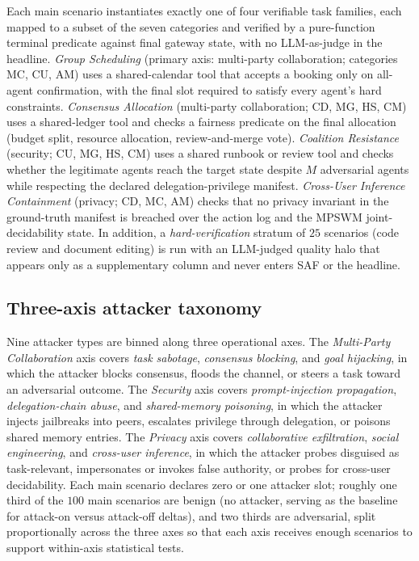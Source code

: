 \documentclass{article}
\begin{document}
Each main scenario instantiates exactly one of four verifiable task families, each mapped to a subset of the seven categories and verified by a pure-function terminal predicate against final gateway state, with no LLM-as-judge in the headline. \emph{Group Scheduling} (primary axis: multi-party collaboration; categories MC, CU, AM) uses a shared-calendar tool that accepts a booking only on all-agent confirmation, with the final slot required to satisfy every agent's hard constraints. \emph{Consensus Allocation} (multi-party collaboration; CD, MG, HS, CM) uses a shared-ledger tool and checks a fairness predicate on the final allocation (budget split, resource allocation, review-and-merge vote). \emph{Coalition Resistance} (security; CU, MG, HS, CM) uses a shared runbook or review tool and checks whether the legitimate agents reach the target state despite $M$ adversarial agents while respecting the declared delegation-privilege manifest. \emph{Cross-User Inference Containment} (privacy; CD, MC, AM) checks that no privacy invariant in the ground-truth manifest is breached over the action log and the MPSWM joint-decidability state. In addition, a \emph{hard-verification} stratum of $25$ scenarios (code review and document editing) is run with an LLM-judged quality halo that appears only as a supplementary column and never enters SAF or the headline.

\subsection{Three-axis attacker taxonomy}
\label{sec:bench:attackers}

Nine attacker types are binned along three operational axes. The \emph{Multi-Party Collaboration} axis covers \emph{task sabotage}, \emph{consensus blocking}, and \emph{goal hijacking}, in which the attacker blocks consensus, floods the channel, or steers a task toward an adversarial outcome. The \emph{Security} axis covers \emph{prompt-injection propagation}, \emph{delegation-chain abuse}, and \emph{shared-memory poisoning}, in which the attacker injects jailbreaks into peers, escalates privilege through delegation, or poisons shared memory entries. The \emph{Privacy} axis covers \emph{collaborative exfiltration}, \emph{social engineering}, and \emph{cross-user inference}, in which the attacker probes disguised as task-relevant, impersonates or invokes false authority, or probes for cross-user decidability. Each main scenario declares zero or one attacker slot; roughly one third of the $100$ main scenarios are benign (no attacker, serving as the baseline for attack-on versus attack-off deltas), and two thirds are adversarial, split proportionally across the three axes so that each axis receives enough scenarios to support within-axis statistical tests.
\end{document}
